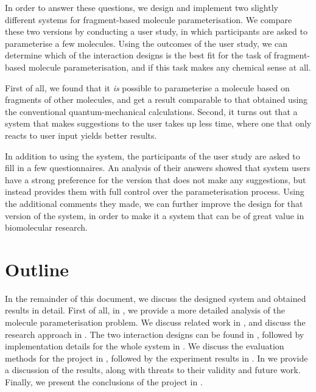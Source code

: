 In order to answer these questions, we design and implement two slightly different systems for fragment-based molecule parameterisation. We compare these two versions by conducting a user study, in which participants are asked to parameterise a few molecules. Using the outcomes of the user study, we can determine which of the interaction designs is the best fit for the task of fragment-based molecule parameterisation, and if this task makes any chemical sense at all.

First of all, we found that it \emph{is} possible to parameterise a molecule based on fragments of other molecules, and get a result comparable to that obtained using the conventional quantum-mechanical calculations. Second, it turns out that a system that makes suggestions to the user takes up less time, where one that only reacts to user input yields better results.

In addition to using the system, the participants of the user study are asked to fill in a few questionnaires. An analysis of their answers showed that system users have a strong preference for the version that does not make any suggestions, but instead provides them with full control over the parameterisation process. Using the additional comments they made, we can further improve the design for that version of the system, in order to make it a system that can be of great value in biomolecular research.



\section{Outline}
In the remainder of this document, we discuss the designed system and obtained results in detail. First of all, in , we provide a more detailed analysis of the molecule parameterisation problem. We discuss related work in , and discuss the research approach in . The two interaction designs can be found in , followed by implementation details for the whole system in . We discuss the evaluation methods for the project in , followed by the experiment results in . In  we provide a discussion of the results, along with threats to their validity and future work. Finally, we present the conclusions of the project in .
